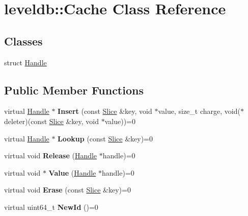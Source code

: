 \hypertarget{classleveldb_1_1_cache}{}\section{leveldb\+::Cache Class Reference}
\label{classleveldb_1_1_cache}
\subsection*{Classes}
\begin{DoxyCompactItemize}
\item 
struct \mbox{\hyperlink{structleveldb_1_1_cache_1_1_handle}{Handle}}
\end{DoxyCompactItemize}
\subsection*{Public Member Functions}
\begin{DoxyCompactItemize}
\item 
\mbox{\label{classleveldb_1_1_cache_af0b55b7fa0e64184fa62e0dbe9ba9eae}} 
virtual \mbox{\hyperlink{structleveldb_1_1_cache_1_1_handle}{Handle}} $\ast$ {\bfseries Insert} (const \mbox{\hyperlink{classleveldb_1_1_slice}{Slice}} \&key, void $\ast$value, size\+\_\+t charge, void($\ast$deleter)(const \mbox{\hyperlink{classleveldb_1_1_slice}{Slice}} \&key, void $\ast$value))=0
\item 
\mbox{\label{classleveldb_1_1_cache_af90785205182a25cf741dc13a48d76cb}} 
virtual \mbox{\hyperlink{structleveldb_1_1_cache_1_1_handle}{Handle}} $\ast$ {\bfseries Lookup} (const \mbox{\hyperlink{classleveldb_1_1_slice}{Slice}} \&key)=0
\item 
\mbox{\label{classleveldb_1_1_cache_a712618c8bf3bfa48b7bab1fbc23c3002}} 
virtual void {\bfseries Release} (\mbox{\hyperlink{structleveldb_1_1_cache_1_1_handle}{Handle}} $\ast$handle)=0
\item 
\mbox{\label{classleveldb_1_1_cache_a454920df8e68917adcf011dfb3538661}} 
virtual void $\ast$ {\bfseries Value} (\mbox{\hyperlink{structleveldb_1_1_cache_1_1_handle}{Handle}} $\ast$handle)=0
\item 
\mbox{\label{classleveldb_1_1_cache_af833a38763598253338de37aba079db6}} 
virtual void {\bfseries Erase} (const \mbox{\hyperlink{classleveldb_1_1_slice}{Slice}} \&key)=0
\item 
\mbox{\label{classleveldb_1_1_cache_ae2d79bfe747fc6c165c77398cc31e125}} 
virtual uint64\+\_\+t {\bfseries New\+Id} ()=0
\end{DoxyCompactItemize}



